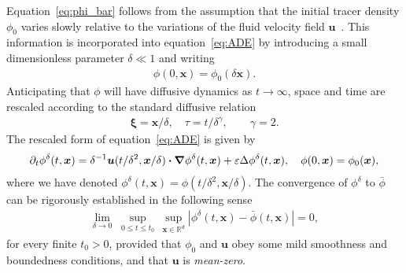 \documentclass[leqno,onefignum,onetabnum]{siamltex1213}
\newcommand\bnabla{\mbox{\boldmath${\nabla}$}}
\providecommand\bcdot{\boldsymbol{\cdot}}
\newcommand{\vecx}{\boldsymbol{x}}
\newcommand{\vecu}{\boldsymbol{u}}
\newcommand{\vecxi}{\boldsymbol{\xi}}
\begin{document}
Equation~\eqref{eq:phi_bar}
follows from the assumption that the
initial tracer density $\phi_0$ varies slowly relative to the variations
of the fluid velocity field 
$\vecu$~\cite{McLaughlin:SIAM_JAM:780,Fannjiang:1997:1033,Majda:Kramer:1999:book}.
This information is incorporated into equation~\eqref{eq:ADE} by
introducing a small dimensionless parameter $\delta\ll1$ and
writing~\cite{McLaughlin:SIAM_JAM:780,Fannjiang:1997:1033,Majda:Kramer:1999:book}      
%
\begin{align}
  \phi(0,\vecx)=\phi_0(\delta\vecx). 
\end{align}
%
Anticipating that $\phi$ will have diffusive dynamics as $t\to\infty$, space and 
time are rescaled according to the standard diffusive relation
%
\begin{align}\label{eq:Fast_Vars}
  \vecxi=\vecx/\delta, \quad
  \tau= t/\delta^\gamma,
  \qquad
  \gamma=2.
\end{align}
%
The rescaled form of equation~\eqref{eq:ADE} is given
by~\cite{Majda:Kramer:1999:book}  
%
\begin{align}\label{eq:ADE_delta}
  \partial_t\phi^\delta(t,\vecx)=\delta^{-1}\vecu(t/\delta^2,\vecx/\delta)\bcdot\bnabla\phi^\delta(t,\vecx)
              +\varepsilon\Delta\phi^\delta(t,\vecx),
              \quad
             \phi(0,\vecx)=\phi_0(\vecx), 
\end{align}
%
where we have denoted $\phi^\delta(t,\vecx)=\phi(t/\delta^2,\vecx/\delta)$.
The convergence of $\phi^\delta$  to $\bar{\phi}$
 can be rigorously established in the following
sense~\cite{Majda:Kramer:1999:book}   
%
\begin{align}\label{eq:Homogenization_Theorem}
  \lim_{\delta\to0}\;\sup_{0\leq t\leq t_0}\,\sup_{\vecx\in\mathbb{R}^d}
  |\phi^\delta(t,\vecx)-\bar{\phi}(t,\vecx)| =0,
\end{align}
%
for every finite $t_0>0$, provided that $\phi_0$ and $\vecu$ obey some
mild smoothness and boundedness conditions, and that $\vecu$ is
\emph{mean-zero}.  
\end{document}
